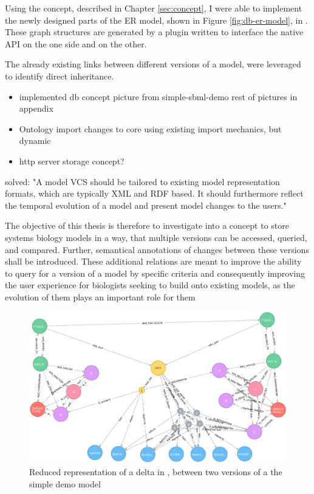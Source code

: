 

Using the concept, described in Chapter \ref{sec:concept}, I were able to implement the newly designed parts of the ER model, shown in Figure \ref{fig:db-er-model}, in \neoj. These graph structures are generated by a plugin written to interface the native \neoj API on the one side and \bives on the other.


The already existing links between different versions of a model, were leveraged to identify direct inheritance.

\begin{itemize}
	\item implemented db concept
		\subitem picture from simple-sbml-demo
		\subitem rest of pictures in appendix
	\item Ontology import
		\subitem changes to \masymos core
		\subitem using existing import mechanics, but dynamic
	\item http server storage concept?
\end{itemize}



solved:
"A model VCS should be tailored to existing model representation formats, which are typically XML and RDF based. It should furthermore reflect the temporal evolution of a model and present model changes to the users." \citep{Waltemath2013}

The objective of this thesis is therefore to investigate into a concept to store systems biology models in a way, that multiple versions can be accessed, queried, and compared. Further, semantical annotations of changes between these versions shall be introduced. These additional relations are meant to improve the ability to query for a version of a model by specific criteria and consequently improving the user experience for biologists seeking to build onto existing models, as the evolution of them plays an important role for them \citep{Scharm2015}

\begin{figure}
	\centering
	\includegraphics[width=\textwidth]{resources/neo4j-renders/demo-sbml-simple-diff.pdf}
	\caption{Reduced representation of a delta in \masymos, between two versions of a the simple \sbml demo model}
	\label{fig:results:simple-diff}
\end{figure}